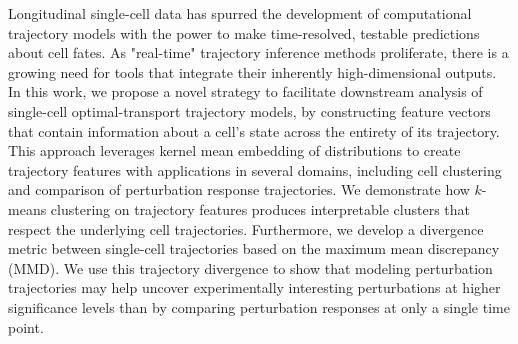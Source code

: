 Longitudinal single-cell data has spurred the development of computational trajectory models with the power to make time-resolved, testable predictions about cell fates. As "real-time" trajectory inference methods proliferate, there is a growing need for tools that integrate their inherently high-dimensional outputs. In this work, we propose a novel  strategy to facilitate downstream analysis of single-cell optimal-transport trajectory models, by constructing feature vectors that contain information about a cell's state across the entirety of its trajectory. This approach leverages kernel mean embedding of distributions to create trajectory features with applications in several domains, including cell clustering and comparison of perturbation response trajectories. We demonstrate how $k$-means clustering on trajectory features produces interpretable clusters that respect the underlying cell trajectories. Furthermore, we develop a divergence metric between single-cell trajectories based on the maximum mean discrepancy (MMD). We use this trajectory divergence to show that modeling perturbation trajectories may help uncover experimentally interesting perturbations at higher significance levels than by comparing perturbation responses at only a single time point.